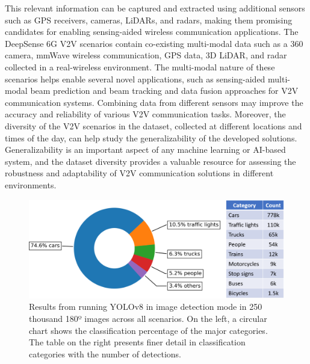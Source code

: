 \documentclass[10pt,comsoc]{IEEEtran}
\begin{document}
This relevant information can be captured and extracted using additional sensors such as GPS receivers, cameras, LiDARs, and radars, making them promising candidates for enabling sensing-aided wireless communication applications. The DeepSense 6G V2V scenarios contain co-existing multi-modal data such as a $360$ camera, mmWave wireless communication, GPS data, 3D LiDAR, and radar collected in a real-wireless environment. The multi-modal nature of these scenarios helps enable several novel applications, such as sensing-aided multi-modal beam prediction and beam tracking and data fusion approaches for V2V communication systems. Combining data from different sensors may improve the accuracy and reliability of various V2V communication tasks. Moreover, the diversity of the V2V scenarios in the dataset, collected at different locations and times of the day, can help study the generalizability of the developed solutions. Generalizability is an important aspect of any machine learning or AI-based system, and the dataset diversity provides a valuable resource for assessing the robustness and adaptability of V2V communication solutions in different environments.

\begin{figure}[t]
	\centering
	\includegraphics[width=1\columnwidth]{yolo_fig3}
	\caption{Results from running YOLOv8 in image detection mode in 250 thousand 180º images across all scenarios. On the left, a circular chart shows the classification percentage of the major categories. The table on the right presents finer detail in classification categories with the number of detections.}
	\label{fig:yolo_results}
\end{figure}
\end{document}
